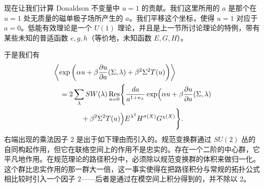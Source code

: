 
现在让我们计算 Donaldson 不变量中 $u=1$ 的贡献。我们这里所用的 $a$ 是那个在 $u=1$ 处无质量的磁单极子场所产生的 $a$。我们平移这个坐标，使得 $u=1$ 对应于 $a=0$。低能有效理论是一个 $U(1)$ 理论，并且是上一节所讨论理论的特例，带有某些未知的普适函数 $e,g,h$（等价地，未知函数 $E,G,H$）。

于是我们有
\[
\begin{aligned}
&\left\langle\exp\left(\alpha u+\beta\frac{\partial u}{\partial a}(\Sigma,\lambda)+\beta^2\Sigma^2T(u)\right)\right\rangle\\
&\quad=2\sum_\lambda SW(\lambda)\operatorname*{Res}_{a=0}\Biggl\{\frac{da}{a^{1+n_\lambda}}
\exp\Bigl(\alpha u+\beta\frac{\partial u}{\partial a}(\Sigma,\lambda)\\
&\qquad\qquad+\beta^2\Sigma^2T(u)\Bigr)E^{\lambda^2}H^{\sigma(X)}G^{\chi(X)}\Biggr\}.
\end{aligned}
\]
右端出现的乘法因子 $2$ 是出于如下理由而引入的。规范变换群通过 $SU(2)$ 丛的自同构起作用，但它在联络空间上的作用不是忠实的。存在一个二阶的中心群，它平凡地作用。在规范理论的路径积分中，必须除以规范变换群的体积来做归一化。这个群比忠实作用的那一群大一倍，这一事实使得在把路径积分与常规的拓扑公式相比较时引入一个因子 $2$——后者是通过在模空间上积分得到的，并不除以 $2$。



